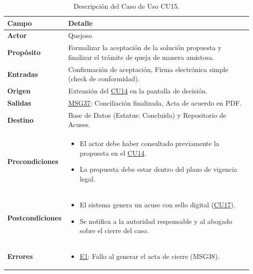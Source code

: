 \begin{appendices}
\begin{table}[htbp]
\centering
\small
{}
\begin{tabular}{|p{3.5cm}|p{10.5cm}|}
\hline
\rowcolor[HTML]{EFEFEF} 
\textbf{Campo} & \textbf{Detalle} \\ \hline
\textbf{Actor} & Quejoso \\ \hline
\textbf{Propósito} & Formalizar la aceptación de la solución propuesta y finalizar el trámite de queja de manera amistosa. \\ \hline
\textbf{Entradas} & Confirmación de aceptación, Firma electrónica simple (check de conformidad). \\ \hline
\textbf{Origen} & Extensión del \hyperlink{anexo:casos_uso}{CU14} en la pantalla de decisión. \\ \hline
\textbf{Salidas} & \hyperlink{msg:MSG37}{MSG37}: Conciliación finalizada, Acta de acuerdo en PDF. \\ \hline
\textbf{Destino} & Base de Datos (Estatus: Concluida) y Repositorio de Acuses. \\ \hline
\textbf{Precondiciones} & 
\begin{itemize}[nosep, leftmargin=*]
    \item El actor debe haber consultado previamente la propuesta en el \hyperlink{anexo:casos_uso}{CU14}.
    \item La propuesta debe estar dentro del plazo de vigencia legal.
\end{itemize} \\ \hline
\textbf{Postcondiciones} & 
\begin{itemize}[nosep, leftmargin=*]
    \item El sistema genera un acuse con sello digital (\hyperlink{anexo:casos_uso}{CU17}).
    \item Se notifica a la autoridad responsable y al abogado sobre el cierre del caso.
\end{itemize} \\ \hline
\textbf{Errores} & 
\begin{itemize}[nosep, leftmargin=*]
    \item \hyperlink{err:E20}{E1}: Fallo al generar el acta de cierre (MSG38).
\end{itemize} \\ \hline
\end{tabular}
\caption{Descripción del Caso de Uso CU15.}
\label{tab:cu15_especificacion}
\end{table}


\end{appendices}
